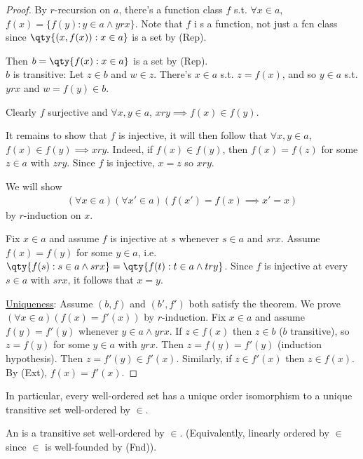 \begin{proof}
    By $r$-recursion on $a$, there's a function class $f$ s.t. $\forall x \in a$, $f(x) = \{f(y) : y \in a \wedge y r x \}$.
    Note that $f$ i s a function, not just a fcn class since $\qty{(x, f(x)) : x \in a}$ is a set by (Rep).

    Then $b = \qty{f(x) : x \in a}$ is a set by (Rep). \\
    $b$ is transitive: Let $z \in b$ and $w \in z$.
    There's $x \in a$ s.t. $z = f(x)$, and so $y \in a$ s.t. $y r x$ and $w = f(y) \in b$.

    Clearly $f$ surjective and $\forall x, y \in a$, $xry \implies f(x) \in f(y)$.

    It remains to show that $f$ is injective, it will then follow that $\forall x, y \in a$, $f(x) \in f(y) \implies x r y$.
    Indeed, if $f(x) \in f(y)$, then $f(x) = f(z)$ for some $z \in a$ with $z r y$.
    Since $f$ is injective, $x = z$ so $x r y$.

    We will show
    \begin{align*}
        (\forall x \in a)(\forall x' \in a)(f(x') = f(x) \implies x' = x)
    \end{align*}
    by $r$-induction on $x$.

    Fix $x \in a$ and assume $f$ is injective at $s$ whenever $s \in a$ and $srx$.
    Assume $f(x) = f(y)$ for some $y \in a$, i.e. $\qty{f(s): s \in a \wedge s r x} = \qty{f(t) : t \in a \wedge try}$.
    Since $f$ is injective at every $s \in a$ with $srx$, it follows that $x = y$.

    \underline{Uniqueness}: Assume $(b, f)$ and $(b', f')$ both satisfy the theorem.
    We prove $(\forall x \in a)(f(x) = f'(x))$ by $r$-induction.
    Fix $x \in a$ and assume $f(y) = f'(y)$ whenever $y \in a \wedge y r x$.
    If $z \in f(x)$ then $z \in b$ ($b$ transitive), so $z = f(y)$ for some $y \in a$ with $y r x$.
    Then $z = f(y) = f'(y)$ (induction hypothesis).
    Then $z = f'(y) \in f'(x)$.
    Similarly, if $z \in f'(x)$ then $z \in f(x)$.
    By (Ext), $f(x) = f'(x)$.
\end{proof}

In particular, every well-ordered set has a unique order isomorphism to a unique transitive set well-ordered by $\in$.

\begin{definition}[Ordinal]
    An  is a transitive set well-ordered by $\in$. (Equivalently, linearly ordered by $\in$ since $\in$ is well-founded by (Fnd)).
\end{definition}

